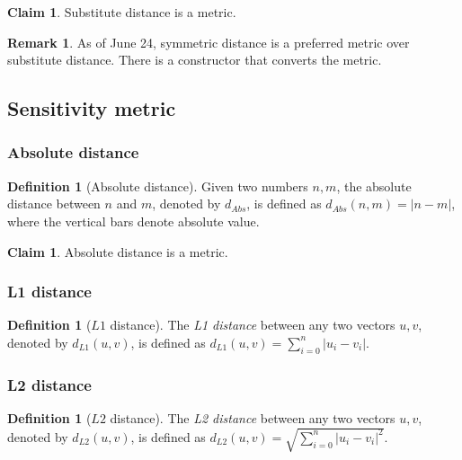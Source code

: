 \documentclass[11pt,a4paper]{article}
\theoremstyle{definition}
\newtheorem{remark}[theorem]{Remark}
\newtheorem{definition}[theorem]{Definition}
\newtheorem{claim}[theorem]{Claim}
\begin{document}
\begin{claim}
Substitute distance is a metric.
\end{claim}


\begin{remark}
    As of June 24, symmetric distance is a preferred metric over substitute distance. There is a constructor that converts the metric.
\end{remark}

\subsection{Sensitivity metric}
\subsubsection{Absolute distance}

\begin{definition}[Absolute distance]\label{def:abs}
    Given two numbers $n, m$, the absolute distance between $n$ and $m$, denoted by $d_{Abs}$, is defined as $d_{Abs}(n, m)= |n-m|$, where the vertical bars denote absolute value.
\end{definition}

\begin{claim}
    Absolute distance is a metric.
\end{claim}

\subsubsection{L1 distance}
\begin{definition}[$L1$ distance]
\label{def:l1-dist}
    The \textit{L1 distance} between any two vectors $u, v$, denoted by $d_{L1}(u, v)$, is defined as $d_{L1}(u, v) = \sum_{i=0}^n |u_i - v_i|$.
\end{definition}

\subsubsection{L2 distance}
\begin{definition}[$L2$ distance]
    The \textit{L2 distance} between any two vectors $u, v$, denoted by $d_{L2}(u, v)$, is defined as $d_{L2}(u, v) = \sqrt{\sum_{i=0}^n |u_i - v_i|^2}$.
\end{definition}
\end{document}
